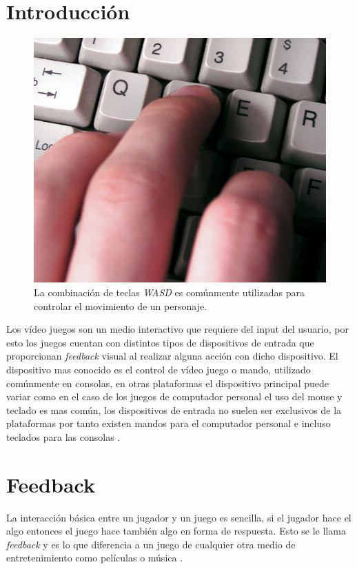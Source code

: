 \section{Introducción}
\setlength\intextsep{0pt}
\begin{figure}
\includegraphics[width=\linewidth]{media/wasd.jpg}
\caption{La combinación de teclas \emph{WASD} es comúnmente utilizadas para controlar el movimiento de un personaje.}
\label{fig:wasd}
\end{figure}
Los vídeo juegos son un medio interactivo que requiere del input del usuario, por esto los juegos cuentan con distintos tipos de dispositivos de entrada que proporcionan \emph{feedback} visual al realizar alguna acción con dicho dispositivo. El dispositivo mas conocido es el control de vídeo juego o mando, utilizado comúnmente en consolas, en otras plataformas el dispositivo principal puede variar como en el caso de los juegos de computador personal el uso del mouse y teclado es mas común, los dispositivos de entrada no suelen ser exclusivos de la plataformas por tanto existen mandos para el computador personal e incluso teclados para las consolas \cite[p.~395]{jenkinscreatinggames}.
\section{Feedback}
La interacción básica entre un jugador y un juego es sencilla, si el jugador hace el algo entonces el juego hace también algo en forma de respuesta. Esto se le llama \emph{feedback} y es lo que diferencia a un juego de cualquier otra medio de entretenimiento como películas o música \cite[p.~18]{bobbatesgamedesign}.

